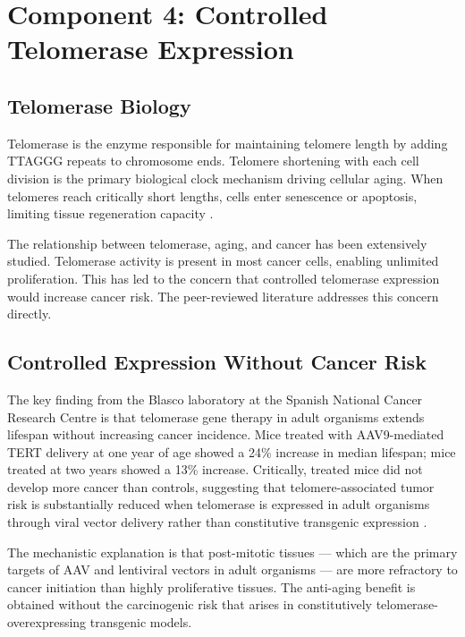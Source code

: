 \documentclass[12pt]{article}
\begin{document}
\section{Component 4: Controlled Telomerase Expression}

\subsection{Telomerase Biology}

Telomerase is the enzyme responsible for maintaining telomere length by adding TTAGGG repeats to chromosome ends. Telomere shortening with each cell division is the primary biological clock mechanism driving cellular aging. When telomeres reach critically short lengths, cells enter senescence or apoptosis, limiting tissue regeneration capacity \cite{telomerase_aging_cancer_pmc}.

The relationship between telomerase, aging, and cancer has been extensively studied. Telomerase activity is present in most cancer cells, enabling unlimited proliferation. This has led to the concern that controlled telomerase expression would increase cancer risk. The peer-reviewed literature addresses this concern directly.

\subsection{Controlled Expression Without Cancer Risk}

The key finding from the Blasco laboratory at the Spanish National Cancer Research Centre is that telomerase gene therapy in adult organisms extends lifespan without increasing cancer incidence. Mice treated with AAV9-mediated TERT delivery at one year of age showed a 24\% increase in median lifespan; mice treated at two years showed a 13\% increase. Critically, treated mice did not develop more cancer than controls, suggesting that telomere-associated tumor risk is substantially reduced when telomerase is expressed in adult organisms through viral vector delivery rather than constitutive transgenic expression \cite{telomerase_aging_mice_2012}.

The mechanistic explanation is that post-mitotic tissues --- which are the primary targets of AAV and lentiviral vectors in adult organisms --- are more refractory to cancer initiation than highly proliferative tissues. The anti-aging benefit is obtained without the carcinogenic risk that arises in constitutively telomerase-overexpressing transgenic models.
\end{document}
